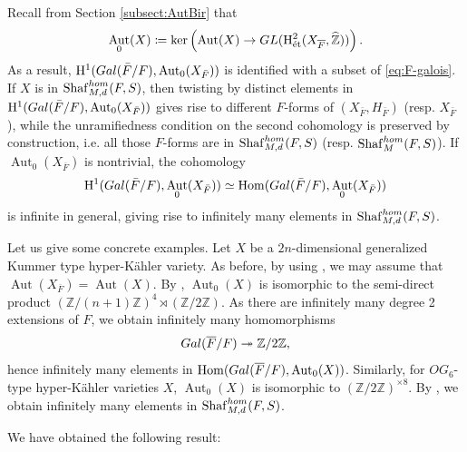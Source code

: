 \documentclass[11pt,reqno,oneside]{amsart}
\numberwithin{equation}{section}
\theoremstyle{definition}
\DeclareMathOperator{\Aut}{Aut}
\newcommand{\Gal}{{\rm Gal}}
\newcommand{\GL}{{\rm GL}}
\DeclareMathOperator{\et}{\Acute{e}t}
\renewcommand{\hom}{{\rm hom}}
\newcommand{\Sha}{\mathrm{Shaf}}
\newcommand\rH{\mathrm{H}}
\newcommand{\ZZ}{\mathbb{Z}}
\begin{document}
Recall from Section  \ref{subsect:AutBir} that
\[
\Aut_0(X)\coloneqq\ker\left(\Aut (X) \rightarrow \GL (\rH^{2}_{\et}(X_{\overline{F}},\widehat{\ZZ}))\right).
\]
As a result, $\rH^1(\Gal(\bar{F}/F), \Aut_0(X_{\bar{F}}))$ is identified with a subset of \eqref{eq:F-galois}. If $X$ is in $\Sha^{\hom}_{M,d}(F,S)$, then twisting by distinct elements in $\rH^1(\Gal(\bar{F}/F), \Aut_0(X_{\bar{F}}))$ gives rise to different $F$-forms of $(X_{\bar{F}}, H_{\bar{F}})$ (resp. $X_{\bar{F}}$), while the unramifiedness condition on the second cohomology is preserved by construction, i.e. all those $F$-forms are in $\Sha^{\hom}_{M,d}(F,S)$ (resp. $\Sha^{\hom}_{M}(F,S)$). If  $\Aut_0(X_{\overline{F}})$ is nontrivial, the cohomology $$\rH^1(\Gal(\bar{F}/F), \Aut_0(X_{\bar{F}}))\simeq \operatorname{Hom}(\Gal(\bar{F}/F),\Aut_0(X_{\bar{F}}))$$ is infinite in general, giving rise to infinitely many elements in $\Sha^{\hom}_{M,d}(F,S)$.


Let us give some concrete examples. 
Let $X$ be a $2n$-dimensional generalized Kummer type hyper-Kähler variety. As before, by using \cite{CattaneoFu}, we may assume that $\Aut(X_{\overline{F}}) = \Aut (X)$. By \cite[Corollary 5]{BNS11}, $\Aut_0(X)$
is isomorphic to the semi-direct product $(\ZZ/(n+1)\ZZ)^{4} \rtimes (\ZZ/2\ZZ)$. As there are infinitely many degree 2 extensions of $F$, we obtain infinitely many homomorphisms 
\[\Gal(\overline{F}/F) \twoheadrightarrow \ZZ/2\ZZ,\]
hence infinitely many elements in $\operatorname{Hom}(\Gal(\overline{F}/F), \Aut_0(X))$. Similarly, for $OG_6$-type hyper-Kähler varieties $X$, $\Aut_0(X)$ is isomorphic to $(\ZZ/2\ZZ)^{\times 8}$. By \cite[Theorem 5.2]{MW17}, we obtain infinitely many elements in $\Sha^{\hom}_{M,d}(F,S)$. 


We have obtained the following result:
\end{document}
